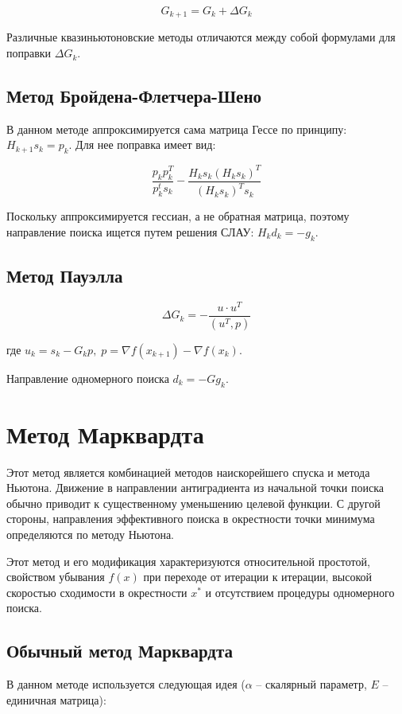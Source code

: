 \documentclass[12pt]{article}
\begin{document}
\[ G_{k+1} = G_k + \Delta G_k \]

Различные квазиньютоновские методы отличаются между собой формулами для поправки $\Delta G_k$.

\subsection{Метод Бройдена-Флетчера-Шено}

В данном методе аппроксимируется сама матрица Гессе по принципу: $H_{k+1}s_k = p_k$. Для нее поправка имеет вид:

\[ \frac{p_k p_k^T}{p_k^t s_k} - \frac{H_k s_k (H_k s_k)^T}{(H_k s_k)^T s_k} \]

Поскольку аппроксимируется гессиан, а не обратная матрица, поэтому направление поиска ищется путем решения СЛАУ: $H_k d_k = -g_k$.

\subsection{Метод Пауэлла}

\[ \Delta G_k = - \frac{u \cdot u^T}{\left(u^T, p \right)} \]

где $u_k = s_k - G_kp, \; p = \nabla f(x_{k+1}) - \nabla f(x_{k})$.

Направление одномерного поиска $d_k = -Gg_k$.

\newpage
\section{Метод Марквардта}

Этот метод является комбинацией методов наискорейшего спуска и метода Ньютона. Движение в направлении антиградиента из начальной точки поиска обычно приводит к существенному уменьшению целевой функции. С другой стороны, направления эффективного поиска в окрестности точки минимума определяются по методу Ньютона.

Этот метод и его модификация характеризуются относительной простотой, свойством убывания $f(x)$ при переходе от итерации к итерации, высокой скоростью сходимости в окрестности $x^*$ и отсутствием процедуры одномерного поиска.

\subsection{Обычный метод Марквардта}

В данном методе используется следующая идея ($\alpha$ -- скалярный параметр, $E$ -- единичная матрица):
\end{document}
